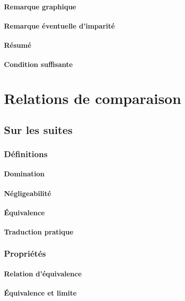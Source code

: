 \documentclass[12pt,a4paper,french]{book}
\begin{document}
			\subsubsection{Remarque graphique}
			\subsubsection{Remarque éventuelle d'imparité}
			\subsubsection{Résumé}
			\subsubsection{Condition suffisante}
			
\chapter{Relations de comparaison}
	\section{Sur les suites}
		\subsection{Définitions}
			\subsubsection{Domination}
			\subsubsection{Négligeabilité}
			\subsubsection{Équivalence}
			\subsubsection{Traduction pratique}
		\subsection{Propriétés}
			\subsubsection{Relation d'équivalence}
			\subsubsection{Équivalence et limite}
\end{document}
